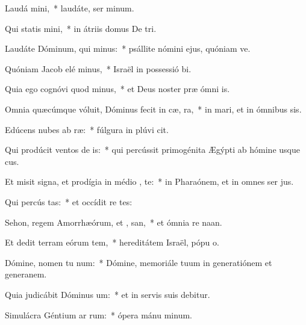 \item Laudá  mini,~* laudáte, ser minum.
\item Qui statis   mini,~* in átriis domus De tri.
\item Laudáte Dóminum, qui  minus:~* psállite nómini ejus, quóniam ve.
\item Quóniam Jacob elé  minus,~* Israël in possessió bi.
\item Quia ego cognóvi quod   minus,~* et Deus noster præ ómni is.
\item Omnia quæcúmque vóluit, Dóminus fecit in cæ,   ra,~* in mari, et in ómnibus sis.
\item Edúcens nubes ab  ræ:~* fúlgura in plúvi cit.
\item Qui prodúcit ventos de  is:~* qui percússit primogénita Ægýpti ab hómine usque  cus.
\item Et misit signa, et prodígia in médio , te:~* in Pharaónem, et in omnes ser jus.
\item Qui percús  tas:~* et occídit re tes:
\item Sehon, regem Amorrhæórum, et ,  san,~* et ómnia re naan.
\item Et dedit terram eórum tem,~* hereditátem Israël, pópu o.
\item Dómine, nomen tu  num:~* Dómine, memoriále tuum in generatiónem et generanem.
\item Quia judicábit Dóminus  um:~* et in servis suis debitur.
\item Simulácra Géntium ar  rum:~* ópera mánu minum.
